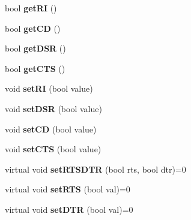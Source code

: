 \begin{DoxyCompactItemize}
\item 
\hypertarget{classCSerial_afe27446d37079765f350746462c92c08}{bool {\bfseries get\-R\-I} ()}\label{classCSerial_afe27446d37079765f350746462c92c08}

\item 
\hypertarget{classCSerial_ad139515800d1af3e9dfb217b0e0fb4d2}{bool {\bfseries get\-C\-D} ()}\label{classCSerial_ad139515800d1af3e9dfb217b0e0fb4d2}

\item 
\hypertarget{classCSerial_a209004fedd6d31a4b7a7fca16ec8aca4}{bool {\bfseries get\-D\-S\-R} ()}\label{classCSerial_a209004fedd6d31a4b7a7fca16ec8aca4}

\item 
\hypertarget{classCSerial_a8a52a185b5f6db6c8ec8f09ff13c3fbb}{bool {\bfseries get\-C\-T\-S} ()}\label{classCSerial_a8a52a185b5f6db6c8ec8f09ff13c3fbb}

\item 
\hypertarget{classCSerial_a7a6232905a214c4eff81b3a6f72dfa72}{void {\bfseries set\-R\-I} (bool value)}\label{classCSerial_a7a6232905a214c4eff81b3a6f72dfa72}

\item 
\hypertarget{classCSerial_a4af51cec0821ca417a9f48e62faac6d8}{void {\bfseries set\-D\-S\-R} (bool value)}\label{classCSerial_a4af51cec0821ca417a9f48e62faac6d8}

\item 
\hypertarget{classCSerial_acd41d30ab6084029529b93141fbc31b2}{void {\bfseries set\-C\-D} (bool value)}\label{classCSerial_acd41d30ab6084029529b93141fbc31b2}

\item 
\hypertarget{classCSerial_a6caf533674711d97b7aed77f83aaa82a}{void {\bfseries set\-C\-T\-S} (bool value)}\label{classCSerial_a6caf533674711d97b7aed77f83aaa82a}

\item 
\hypertarget{classCSerial_ada8a1f2077454e088db6805b12e4616e}{virtual void {\bfseries set\-R\-T\-S\-D\-T\-R} (bool rts, bool dtr)=0}\label{classCSerial_ada8a1f2077454e088db6805b12e4616e}

\item 
\hypertarget{classCSerial_a3ad85c5e6fe53d4934eebff8234226f3}{virtual void {\bfseries set\-R\-T\-S} (bool val)=0}\label{classCSerial_a3ad85c5e6fe53d4934eebff8234226f3}

\item 
\hypertarget{classCSerial_ae633ef093a4cd8b82c373f2768896f78}{virtual void {\bfseries set\-D\-T\-R} (bool val)=0}\label{classCSerial_ae633ef093a4cd8b82c373f2768896f78}


\end{DoxyCompactItemize}
